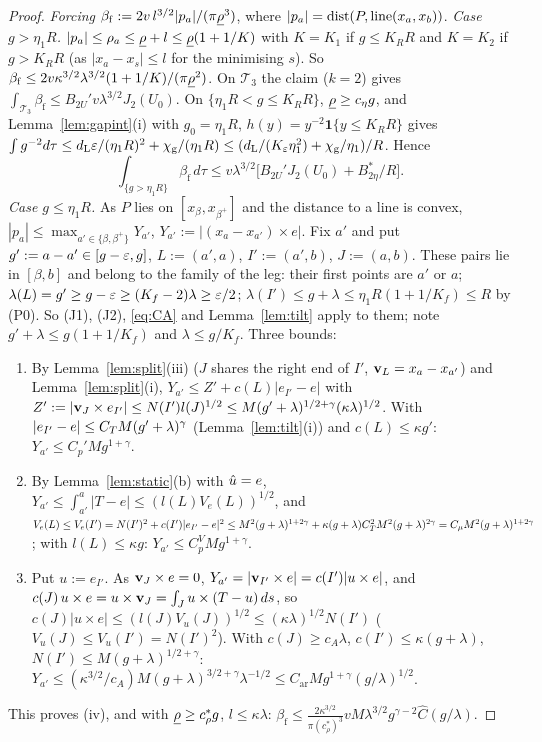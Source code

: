 \begin{proof}
\emph{Forcing} $\beta_{\mathrm f}:=2v\,l^{3/2}|p_a|/(\pi\underline\rho^3)$, where $|p_a|=\operatorname{dist}(P,\text{line}(x_a,x_b))$.
\emph{Case $g>\eta_1R$.} $|p_a|\le\rho_a\le\underline\rho+l\le\underline\rho(1+1/K)$ with $K=K_1$ if $g\le K_RR$ and $K=K_2$ if $g>K_RR$ (as
$|x_a-x_s|\le l$ for the minimising $s$). So $\beta_{\mathrm f}\le2v\kappa^{3/2}\lambda^{3/2}(1+1/K)/(\pi\underline\rho^2)$. On $\mathcal T_3$ the
claim ($k=2$) gives $\int_{\mathcal T_3}\beta_{\mathrm f}\le B_{2U}'v\lambda^{3/2}J_2(U_0)$. On $\{\eta_1R<g\le K_RR\}$, $\underline\rho\ge c_\eta g$, and
Lemma~\ref{lem:gapint}(i) with $g_0=\eta_1R$, $h(y)=y^{-2}\mathbf 1\{y\le K_RR\}$ gives
$\int g^{-2}d\tau\le d_{\mathrm L}\varepsilon/(\eta_1R)^2+\chi_{\mathrm g}/(\eta_1R)\le(d_{\mathrm L}/(K_\varepsilon\eta_1^2)+\chi_{\mathrm g}/\eta_1)/R$. Hence
\[
\int_{\{g>\eta_1R\}}\beta_{\mathrm f}\,d\tau\le v\lambda^{3/2}\bigl[B_{2U}'J_2(U_0)+B_{2\eta}^*/R\bigr].
\]
\emph{Case $g\le\eta_1R$.} As $P$ lies on $[x_\beta,x_{\beta^+}]$ and the distance to a line is convex,
$|p_a|\le\max_{a'\in\{\beta,\beta^+\}}Y_{a'}$, $Y_{a'}:=|(x_a-x_{a'})\times e|$. Fix $a'$ and put $g':=a-a'\in[g-\varepsilon,g]$,
$L:=(a',a)$, $I':=(a',b)$, $J:=(a,b)$. These pairs lie in $[\beta,b]$ and belong to the family of the leg: their first points are $a'$
or $a$; $\lambda(L)=g'\ge g-\varepsilon\ge(K_f-2)\lambda\ge\varepsilon/2$; $\lambda(I')\le g+\lambda\le\eta_1R(1+1/K_f)\le R$ by (P0). So (J1), (J2),
\eqref{eq:CA} and Lemma~\ref{lem:tilt} apply to them; note $g'+\lambda\le g(1+1/K_f)$ and $\lambda\le g/K_f$. Three bounds:
\begin{enumerate}
\item[(1)] By Lemma~\ref{lem:split}(iii) ($J$ shares the right end of $I'$, $\mathbf v_L=x_a-x_{a'}$) and Lemma~\ref{lem:split}(i),
$Y_{a'}\le Z'+c(L)|e_{I'}-e|$ with $Z':=|\mathbf v_J\times e_{I'}|\le N(I')l(J)^{1/2}\le M(g'+\lambda)^{1/2+\gamma}(\kappa\lambda)^{1/2}$. With
$|e_{I'}-e|\le C_T M(g'+\lambda)^\gamma$ (Lemma~\ref{lem:tilt}(i)) and $c(L)\le\kappa g'$: $Y_{a'}\le C_p'Mg^{1+\gamma}$.
\item[(2)] By Lemma~\ref{lem:static}(b) with $\hat u=e$, $Y_{a'}\le\int_{a'}^a|T-e|\le(l(L)V_e(L))^{1/2}$, and
$V_e(L)\le V_e(I')=N(I')^2+c(I')|e_{I'}-e|^2\le M^2(g+\lambda)^{1+2\gamma}+\kappa(g+\lambda)C_T^2M^2(g+\lambda)^{2\gamma}=C_\mu M^2(g+\lambda)^{1+2\gamma}$;
with $l(L)\le\kappa g$: $Y_{a'}\le C_p^VMg^{1+\gamma}$.
\item[(3)] Put $u:=e_{I'}$. As $\mathbf v_J\times e=0$, $Y_{a'}=|\mathbf v_{I'}\times e|=c(I')|u\times e|$, and
$c(J)\,u\times e=u\times\mathbf v_J=\int_Ju\times(T-u)\,ds$, so $c(J)|u\times e|\le(l(J)V_u(J))^{1/2}\le(\kappa\lambda)^{1/2}N(I')$
($V_u(J)\le V_u(I')=N(I')^2$). With $c(J)\ge c_A\lambda$, $c(I')\le\kappa(g+\lambda)$, $N(I')\le M(g+\lambda)^{1/2+\gamma}$:
$Y_{a'}\le(\kappa^{3/2}/c_A)M(g+\lambda)^{3/2+\gamma}\lambda^{-1/2}\le C_{\mathrm{ar}}Mg^{1+\gamma}(g/\lambda)^{1/2}$.
\end{enumerate}
This proves (iv), and with $\underline\rho\ge c_\rho^*g$, $l\le\kappa\lambda$:
$\beta_{\mathrm f}\le\frac{2\kappa^{3/2}}{\pi(c_\rho^*)^3}vM\lambda^{3/2}g^{\gamma-2}\hat C(g/\lambda)$.


\end{proof}
